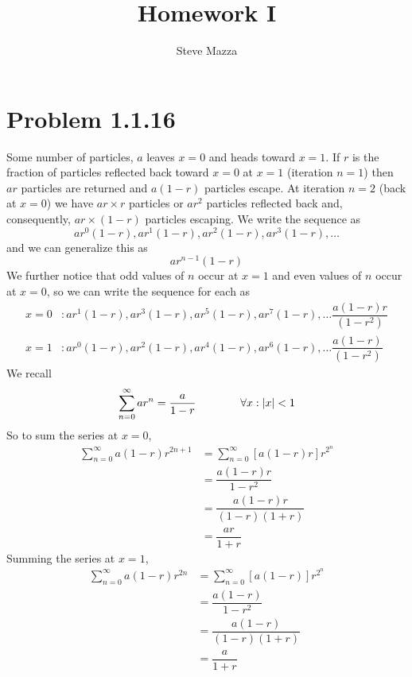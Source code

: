 \documentclass[letterpaper,10pt]{article}
\title{Homework I}
\author{Steve Mazza}
\begin{document}
\maketitle

\section*{Problem 1.1.16}
Some number of particles, $a$ leaves $x=0$ and heads toward $x=1$.  If $r$ is the fraction of particles reflected back toward $x=0$ at $x=1$ (iteration $n=1$) then $ar$ particles are returned and $a(1-r)$ particles escape.  At iteration $n=2$ (back at $x=0$) we have $ar\times r$ particles or $ar^2$ particles reflected back and, consequently, $ar \times (1-r)$ particles escaping.  We write the sequence as
\[
	ar^0(1-r), ar^1(1-r), ar^2(1-r), ar^3(1-r),\dots
\]
and we can generalize this as 
\begin{equation}
	ar^{n-1}(1-r)
\end{equation}
We further notice that odd values of $n$ occur at $x=1$ and even values of $n$ occur at $x=0$, so we can write the sequence for each as
\begin{align}
	x=0&: ar^{1}(1-r), ar^{3}(1-r), ar^{5}(1-r), ar^{7}(1-r), \dots \dfrac{a(1-r)r}{(1-r^2)} \\
	x=1&: ar^{0}(1-r), ar^{2}(1-r), ar^{4}(1-r), ar^{6}(1-r), \dots \dfrac{a(1-r)}{(1-r^2)}
\end{align}
We recall
\begin{equation*}
	\sum\limits_{n=0}^\infty ar^n=\dfrac{a}{1-r} \mbox{\hspace{4em}}\forall x: |x|<1
\end{equation*}
So to sum the series at $x=0$,
\begin{align*}
	\sum\limits_{n=0}^\infty a(1-r)r^{2n+1} &= \sum\limits_{n=0}^\infty[a(1-r)r]r^{2^n} \\
	&= \dfrac{a(1-r)r}{1-r^2} \\
	&= \dfrac{a(1-r)r}{(1-r)(1+r)} \\
	&= \dfrac{ar}{1+r}
\end{align*}
Summing the series at $x=1$,
\begin{align*}
	\sum\limits_{n=0}^\infty a(1-r)r^{2n} &= \sum\limits_{n=0}^\infty[a(1-r)]r^{2^n} \\
	&= \dfrac{a(1-r)}{1-r^2} \\
	&= \dfrac{a(1-r)}{(1-r)(1+r)} \\
	&= \dfrac{a}{1+r}
\end{align*}
\end{document}
